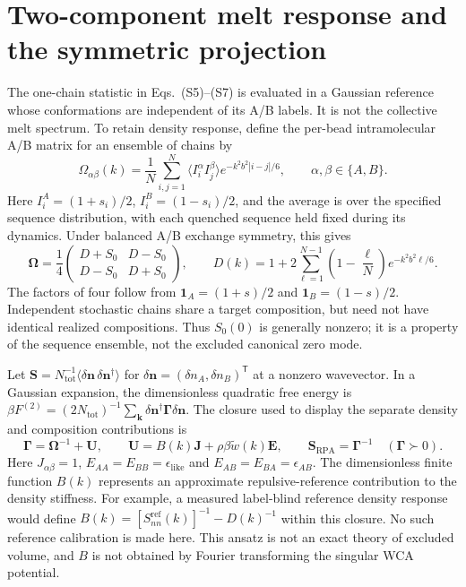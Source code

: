 \section*{Two-component melt response and the symmetric projection}

The one-chain statistic in Eqs.~(S5)--(S7) is evaluated in a Gaussian reference whose conformations are independent of its A/B labels. It is not the collective melt spectrum. To retain density response, define the per-bead intramolecular A/B matrix for an ensemble of chains by
\[
\Omega_{\alpha\beta}(k)=\frac1N\sum_{i,j=1}^N
 \bigl\langle I_i^\alpha I_j^\beta\bigr\rangle
 e^{-k^2b^2|i-j|/6},\qquad \alpha,\beta\in\{A,B\}.
\]
Here $I_i^A=(1+s_i)/2$, $I_i^B=(1-s_i)/2$, and the average is over the specified sequence distribution, with each quenched sequence held fixed during its dynamics. Under balanced A/B exchange symmetry, this gives
\[
\boldsymbol\Omega=\frac14
 \begin{pmatrix}D+S_0&D-S_0\\D-S_0&D+S_0\end{pmatrix},
\qquad
D(k)=1+2\sum_{\ell=1}^{N-1}\left(1-\frac\ell N\right)e^{-k^2b^2\ell/6}.
\]
The factors of four follow from $\mathbf 1_A=(1+s)/2$ and $\mathbf 1_B=(1-s)/2$. Independent stochastic chains share a target composition, but need not have identical realized compositions. Thus $S_0(0)$ is generally nonzero; it is a property of the sequence ensemble, not the excluded canonical zero mode.

Let $\mathbf S=N_{\mathrm{tot}}^{-1}\langle\delta\mathbf n\,\delta\mathbf n^{\dagger}\rangle$ for $\delta\mathbf n=(\delta n_A,\delta n_B)^{\mathsf T}$ at a nonzero wavevector. In a Gaussian expansion, the dimensionless quadratic free energy is $\beta F^{(2)}=(2N_{\mathrm{tot}})^{-1}\sum_{\bm k}\delta\mathbf n^{\dagger}\boldsymbol\Gamma\delta\mathbf n$. The closure used to display the separate density and composition contributions is
\[
\boldsymbol\Gamma=\boldsymbol\Omega^{-1}+\mathbf U,
\qquad
\mathbf U=B(k)\mathbf J+\rho\beta\widetilde w(k)\mathbf E,
\qquad
\mathbf S_{\mathrm{RPA}}=\boldsymbol\Gamma^{-1}
\quad(\boldsymbol\Gamma\succ0).
\]
Here $J_{\alpha\beta}=1$, $E_{AA}=E_{BB}=\epsilon_{\mathrm{like}}$ and $E_{AB}=E_{BA}=\epsilon_{AB}$. The dimensionless finite function $B(k)$ represents an approximate repulsive-reference contribution to the density stiffness. For example, a measured label-blind reference density response would define $B(k)=[S_{nn}^{\mathrm{ref}}(k)]^{-1}-D(k)^{-1}$ within this closure. No such reference calibration is made here. This ansatz is not an exact theory of excluded volume, and $B$ is not obtained by Fourier transforming the singular WCA potential.

